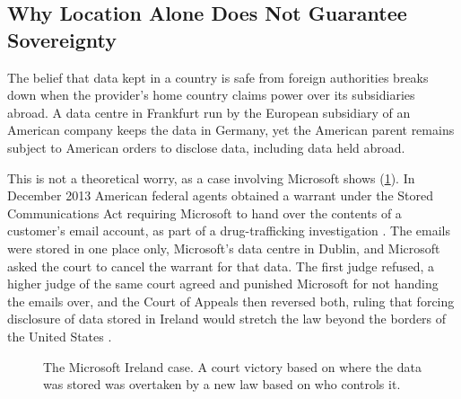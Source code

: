 \subsection{Why Location Alone Does Not Guarantee Sovereignty}
\label{subsec:location-jurisdiction}

The belief that data kept in a country is safe from foreign authorities breaks
down when the provider's home country claims power over its subsidiaries abroad.
A data centre in Frankfurt run by the European subsidiary of an American company
keeps the data in Germany, yet the American parent remains subject to American
orders to disclose data, including data held abroad.

This is not a theoretical worry, as a case involving Microsoft shows
(\cref{fig:microsoft-ireland}). In December 2013 American federal agents obtained
a warrant under the Stored Communications Act requiring Microsoft to hand over the
contents of a customer's email account, as part of a drug-trafficking
investigation \cite{MicrosoftIreland_SCOTUS_2018}. The emails were stored in one
place only, Microsoft's data centre in Dublin, and Microsoft asked the court to cancel
the warrant for that data. The first judge refused, a higher judge of the same court
agreed and punished Microsoft for not handing the emails over, and the Court of Appeals then
reversed both, ruling that forcing disclosure of data stored in Ireland would
stretch the law beyond the borders of the United States
\cite{MicrosoftIreland_2dCir_2016}.

\begin{figure}[htbp]
  \centering
  \caption{The Microsoft Ireland case. A court victory based on where the data was
           stored was overtaken by a new law based on who controls it.}
  \label{fig:microsoft-ireland}
\end{figure}

